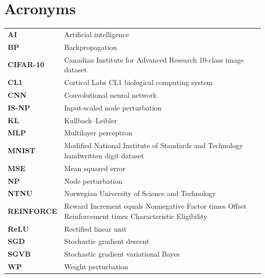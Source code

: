 \clearpage
\section*{Acronyms}

\begin{tabularx}{\textwidth}{lX}
\textbf{AI} & Artificial intelligence \\
\textbf{BP} & Backpropagation \\
\textbf{CIFAR-10} & Canadian Institute for Advanced Research 10-class image dataset \\
\textbf{CL1} & Cortical Labs CL1 biological computing system \\
\textbf{CNN} & Convolutional neural network \\
\textbf{IS-NP} & Input-scaled node perturbation \\
\textbf{KL} & Kullback--Leibler \\
\textbf{MLP} & Multilayer perceptron \\
\textbf{MNIST} & Modified National Institute of Standards and Technology handwritten digit dataset \\
\textbf{MSE} & Mean squared error \\
\textbf{NP} & Node perturbation \\
\textbf{NTNU} & Norwegian University of Science and Technology \\
\textbf{REINFORCE} & Reward Increment equals Nonnegative Factor times Offset Reinforcement times Characteristic Eligibility \\
\textbf{ReLU} & Rectified linear unit \\
\textbf{SGD} & Stochastic gradient descent \\
\textbf{SGVB} & Stochastic gradient variational Bayes \\
\textbf{WP} & Weight perturbation \\
\end{tabularx}
